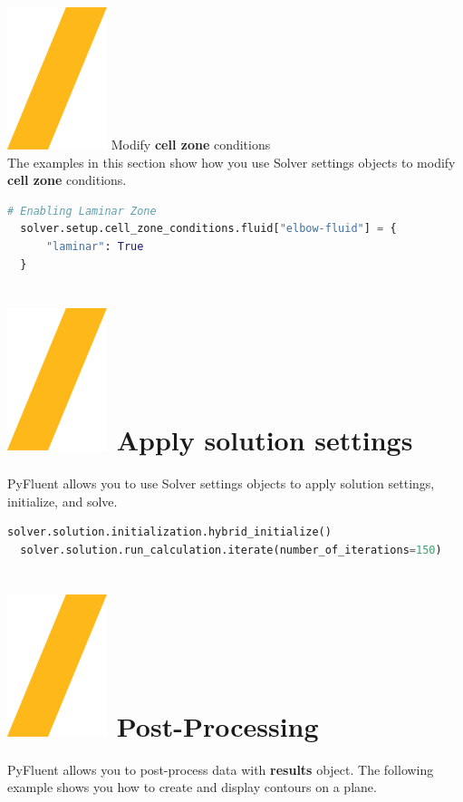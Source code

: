 \documentclass[9pt,landscape]{article}
\begin{document}
\begin{multicols}{3}
{\vfill
{\includegraphics[height=\fontcharht\font`\S]{slash.png}  Modify \textbf{cell zone} conditions} \\
The examples in this section show how you use Solver settings objects to modify \textbf{cell zone} conditions.
\begin{lstlisting}[language=Python]
  # Enabling Laminar Zone  
  solver.setup.cell_zone_conditions.fluid["elbow-fluid"] = {
      "laminar": True
  }
\end{lstlisting}
\vfill

\vfill
\section{\includegraphics[height=\fontcharht\font`\S]{slash.png}  Apply solution settings}
PyFluent allows you to use Solver settings objects to apply
solution settings, initialize, and solve.

\begin{lstlisting}[language=Python]
  solver.solution.initialization.hybrid_initialize()
  solver.solution.run_calculation.iterate(number_of_iterations=150)
\end{lstlisting}

\section{\includegraphics[height=\fontcharht\font`\S]{slash.png}  Post-Processing}
PyFluent allows you to post-process data with \textbf{results} object. The following example shows you how to create and display contours on a plane.

}
\end{multicols}
\end{document}
